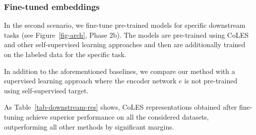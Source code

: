 \documentclass[sigconf, anonymous]{acmart}
\begin{document}
\subsubsection{Fine-tuned embeddings}

In the second scenario, we fine-tune pre-trained models for specific downstream tasks (see Figure~\ref{fig-arch}, Phase 2b). The models are pre-trained using CoLES and other self-supervised learning approaches and then are additionally trained on the labeled data for the specific task.


In addition to the aforementioned baselines, we compare our method with a supervised learning approach where the encoder network $e$ is not pre-trained using self-supervised target.

As Table~\ref{tab-downstream-res} shows, CoLES representations obtained after fine-tuning achieve superior performance on all the considered datasets, outperforming all other methods by significant margins.
\end{document}

